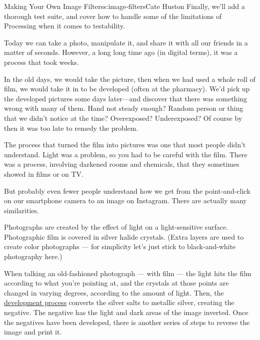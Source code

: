 \begin{aosachapter}{Making Your Own Image Filters}{s:image-filters}{Cate Huston}
Finally, we'll add a thorough test suite, and cover how to handle some
of the limitations of Processing when it comes to testability.

\label{background}

Today we can take a photo, manipulate it, and share it with all our
friends in a matter of seconds. However, a long long time ago (in
digital terms), it was a process that took weeks.

In the old days, we would take the picture, then when we had used a
whole roll of film, we would take it in to be developed (often at the
pharmacy). We'd pick up the developed pictures some days later---and
discover that there was something wrong with many of them. Hand not
steady enough? Random person or thing that we didn't notice at the time?
Overexposed? Underexposed? Of course by then it was too late to remedy
the problem.

The process that turned the film into pictures was one that most people
didn't understand. Light was a problem, so you had to be careful with
the film. There was a process, involving darkened rooms and chemicals,
that they sometimes showed in films or on TV.

But probably even fewer people understand how we get from the
point-and-click on our smartphone camera to an image on Instagram. There
are actually many similarities.

\label{photographs-the-old-way}

Photographs are created by the effect of light on a light-sensitive
surface. Photographic film is covered in silver halide crystals. (Extra
layers are used to create color photographs --- for simplicity let's
just stick to black-and-white photography here.)

When talking an old-fashioned photograph --- with film --- the light
hits the film according to what you're pointing at, and the crystals at
those points are changed in varying degrees, according to the amount of
light. Then, the
\href{http://photography.tutsplus.com/tutorials/step-by-step-guide-to-developing-black-and-white-t-max-film-{}-photo-2580}{development
process} converts the silver salts to metallic silver, creating the
negative. The negative has the light and dark areas of the image
inverted. Once the negatives have been developed, there is another
series of steps to reverse the image and print it.

\label{photographs-the-digital-way}


\end{aosachapter}
